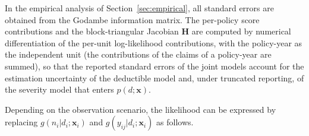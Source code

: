 \documentclass[11pt]{article}
\newcommand{\rev}[1]{{\color{blue}#1}}
\begin{document}
\rev{In the empirical analysis of Section~\ref{sec:empirical}, all standard errors are obtained from the Godambe information matrix. The per-policy score contributions and the block-triangular Jacobian $\bm{H}$ are computed by numerical differentiation of the per-unit log-likelihood contributions, with the policy-year as the independent unit (the contributions of the claims of a policy-year are summed), so that the reported standard errors of the joint models account for the estimation uncertainty of the deductible model and, under truncated reporting, of the severity model that enters $p(d;\bm{x})$.}

Depending on the \rev{observation scenario}, the likelihood can be expressed by replacing $g(n_{i}|d_i;\bm{x}_i)$ and $g(y_{ij}|d_i;\bm{x}_i)$ as follows.
\end{document}
